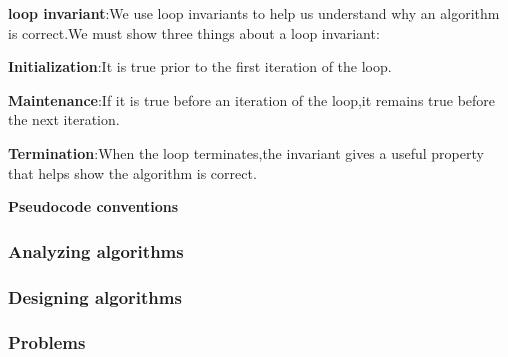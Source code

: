 \documentclass[UTF8,a4paper,12pt]{ctexart}
\begin{document}
                \textbf{loop invariant}:We use loop invariants to help us understand why an algorithm is correct.We must show three things about a loop invariant:

                \textbf{Initialization}:It is true prior to the first iteration of the loop.

                \textbf{Maintenance}:If it is true before an iteration of the loop,it remains true before the next iteration.

                \textbf{Termination}:When the loop terminates,the invariant gives a useful property that helps show the algorithm is correct.

                \textbf{Pseudocode conventions}
            \subsubsection{Analyzing algorithms}
            \subsubsection{Designing algorithms}
            \subsubsection{Problems}      
\end{document}

